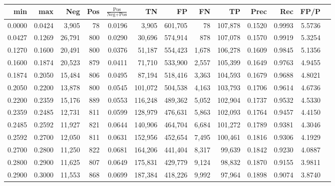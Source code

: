 \begin{tabular}{rrrrrrrrrrrrr}
\toprule
   min &    max &    Neg &   Pos & $\frac{\text{Pos}}{\text{Neg}+\text{Pos}}$ &      TN &      FP &      FN &      TP &   Prec &    Rec &   FP/P \\
\midrule
0.0000 & 0.0424 &  3,905 &    78 &                                     0.0196 &   3,905 & 601,705 &      78 & 107,878 & 0.1520 & 0.9993 & 5.5736 \\
0.0427 & 0.1269 & 26,791 &   800 &                                     0.0290 &  30,696 & 574,914 &     878 & 107,078 & 0.1570 & 0.9919 & 5.3254 \\
0.1270 & 0.1600 & 20,491 &   800 &                                     0.0376 &  51,187 & 554,423 &   1,678 & 106,278 & 0.1609 & 0.9845 & 5.1356 \\
0.1600 & 0.1874 & 20,523 &   879 &                                     0.0411 &  71,710 & 533,900 &   2,557 & 105,399 & 0.1649 & 0.9763 & 4.9455 \\
0.1874 & 0.2050 & 15,484 &   806 &                                     0.0495 &  87,194 & 518,416 &   3,363 & 104,593 & 0.1679 & 0.9688 & 4.8021 \\
0.2050 & 0.2200 & 13,878 &   800 &                                     0.0545 & 101,072 & 504,538 &   4,163 & 103,793 & 0.1706 & 0.9614 & 4.6736 \\
0.2200 & 0.2359 & 15,176 &   889 &                                     0.0553 & 116,248 & 489,362 &   5,052 & 102,904 & 0.1737 & 0.9532 & 4.5330 \\
0.2359 & 0.2485 & 12,731 &   811 &                                     0.0599 & 128,979 & 476,631 &   5,863 & 102,093 & 0.1764 & 0.9457 & 4.4150 \\
0.2485 & 0.2592 & 11,927 &   821 &                                     0.0644 & 140,906 & 464,704 &   6,684 & 101,272 & 0.1789 & 0.9381 & 4.3046 \\
0.2592 & 0.2700 & 12,050 &   811 &                                     0.0631 & 152,956 & 452,654 &   7,495 & 100,461 & 0.1816 & 0.9306 & 4.1929 \\
0.2700 & 0.2800 & 11,250 &   822 &                                     0.0681 & 164,206 & 441,404 &   8,317 &  99,639 & 0.1842 & 0.9230 & 4.0887 \\
0.2800 & 0.2900 & 11,625 &   807 &                                     0.0649 & 175,831 & 429,779 &   9,124 &  98,832 & 0.1870 & 0.9155 & 3.9811 \\
0.2900 & 0.3000 & 11,553 &   868 &                                     0.0699 & 187,384 & 418,226 &   9,992 &  97,964 & 0.1898 & 0.9074 & 3.8740 \\

\end{tabular}
